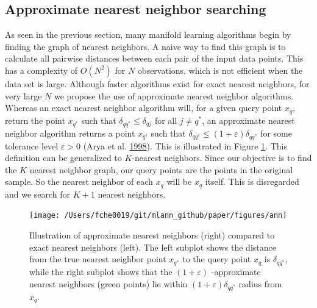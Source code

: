 \documentclass[12pt]{article}
\begin{document}
\hypertarget{ann}{%
\subsection{Approximate nearest neighbor searching}\label{ann}}

As seen in the previous section, many manifold learning algorithms begin by finding the graph of nearest neighbors. A naive way to find this graph is to calculate all pairwise distances between each pair of the input data points. This has a complexity of \(O(N^2)\) for \(N\) observations, which is not efficient when the data set is large. Although faster algorithms exist for exact nearest neighbors, for very large \(N\) we propose the use of approximate nearest neighbor algorithms. Whereas an exact nearest neighbor algorithm will, for a given query point \(x_q\), return the point \(x_{q^*}\) such that \(\delta_{q{q^*}} \leq \delta_{qj}\) for all \(j\neq q^*\), an approximate nearest neighbor algorithm returns a point \(x_{q^\dagger}\) such that \(\delta_{q{q^\dagger}} \leq (1+\varepsilon) \delta_{q{q^*}}\) for some tolerance level \(\varepsilon > 0\) (Arya et al. \protect\hyperlink{ref-AryaSunil1998-nd}{1998}). This is illustrated in Figure \ref{fig:ann}. This definition can be generalized to \(K\)-nearest neighbors. Since our objective is to find the \(K\) nearest neighbor graph, our query points are the points in the original sample. So the nearest neighbor of each \(x_q\) will be \(x_q\) itself. This is disregarded and we search for \(K+1\) nearest neighbors.

\begin{figure}

{\centering \texttt{[image: /Users/fche0019/git/mlann\_github/paper/figures/ann]} 

}

\caption{Illustration of approximate nearest neighbors (right) compared to exact nearest neighbors (left). The left subplot shows the distance from the true nearest neighbor point $x_{q^*}$ to the query point $x_q$ is $\delta_{q{q^*}}$, while the right subplot shows that the $(1+\varepsilon)$ -approximate nearest neighbors (green points) lie within $(1+\varepsilon) \delta_{q{q^*}}$ radius from $x_q$. }\label{fig:ann}
\end{figure}
\end{document}
